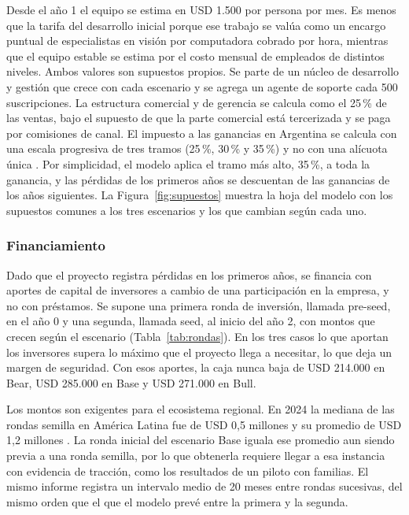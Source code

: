 Desde el año 1 el equipo se estima en USD 1.500 por persona por mes.
Es menos que la tarifa del desarrollo inicial porque ese trabajo se valúa como un encargo puntual de especialistas en visión por computadora cobrado por hora, mientras que el equipo estable se estima por el costo mensual de empleados de distintos niveles.
Ambos valores son supuestos propios.
Se parte de un núcleo de desarrollo y gestión que crece con cada escenario y se agrega un agente de soporte cada 500 suscripciones.
La estructura comercial y de gerencia se calcula como el 25\,\% de las ventas, bajo el supuesto de que la parte comercial está tercerizada y se paga por comisiones de canal.
El impuesto a las ganancias en Argentina se calcula con una escala progresiva de tres tramos (25\,\%, 30\,\% y 35\,\%) y no con una alícuota única \parencite{ARCA2026}.
Por simplicidad, el modelo aplica el tramo más alto, 35\,\%, a toda la ganancia, y las pérdidas de los primeros años se descuentan de las ganancias de los años siguientes.
La Figura~\ref{fig:supuestos} muestra la hoja del modelo con los supuestos comunes a los tres escenarios y los que cambian según cada uno.


\subsubsection{Financiamiento}

Dado que el proyecto registra pérdidas en los primeros años, se financia con aportes de capital de inversores a cambio de una participación en la empresa, y no con préstamos.
Se supone una primera ronda de inversión, llamada pre-seed, en el año 0 y una segunda, llamada seed, al inicio del año 2, con montos que crecen según el escenario (Tabla~\ref{tab:rondas}).
En los tres casos lo que aportan los inversores supera lo máximo que el proyecto llega a necesitar, lo que deja un margen de seguridad.
Con esos aportes, la caja nunca baja de USD 214.000 en Bear, USD 285.000 en Base y USD 271.000 en Bull.

Los montos son exigentes para el ecosistema regional.
En 2024 la mediana de las rondas semilla en América Latina fue de USD 0,5 millones y su promedio de USD 1,2 millones \parencite{LAVCA2025}.
La ronda inicial del escenario Base iguala ese promedio aun siendo previa a una ronda semilla, por lo que obtenerla requiere llegar a esa instancia con evidencia de tracción, como los resultados de un piloto con familias.
El mismo informe registra un intervalo medio de 20 meses entre rondas sucesivas, del mismo orden que el que el modelo prevé entre la primera y la segunda.

